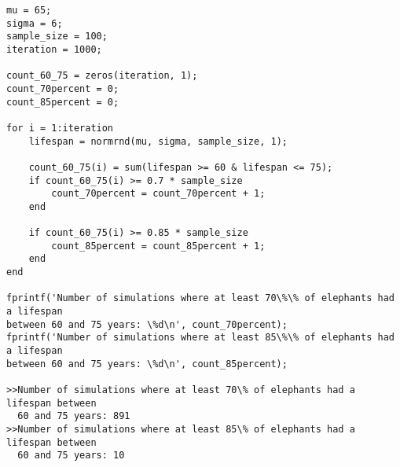 \documentclass[12pt]{article}
\begin{document}
\begin{verbatim}
mu = 65;
sigma = 6;
sample_size = 100;
iteration = 1000;

count_60_75 = zeros(iteration, 1);
count_70percent = 0;
count_85percent = 0;

for i = 1:iteration
    lifespan = normrnd(mu, sigma, sample_size, 1);
    
    count_60_75(i) = sum(lifespan >= 60 & lifespan <= 75);
    if count_60_75(i) >= 0.7 * sample_size
        count_70percent = count_70percent + 1;
    end
    
    if count_60_75(i) >= 0.85 * sample_size
        count_85percent = count_85percent + 1;
    end
end

fprintf('Number of simulations where at least 70\%\% of elephants had a lifespan 
between 60 and 75 years: \%d\n', count_70percent);
fprintf('Number of simulations where at least 85\%\% of elephants had a lifespan 
between 60 and 75 years: \%d\n', count_85percent);

>>Number of simulations where at least 70\% of elephants had a lifespan between 
  60 and 75 years: 891
>>Number of simulations where at least 85\% of elephants had a lifespan between 
  60 and 75 years: 10
\end{verbatim}
\end{document}
